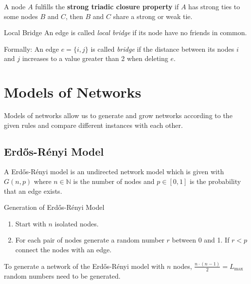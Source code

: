 \documentclass[english]{panikzettel}
\begin{document}
A node $ A $ fulfills the \textbf{strong triadic closure property} if $ A $ has strong ties to some nodes $ B $ and $ C $, then $ B $ and $ C $ share a strong or weak tie.

\begin{defi}{Local Bridge}
	An edge is called \emph{local bridge} if its node have no friends in common.

	Formally: An edge $ e = \{i,j\} $ is called \emph{bridge} if the distance between its nodes $ i $ and $ j $ increases to a value greater than 2 when deleting $ e $.
\end{defi}

\section{Models of Networks}
Models of networks allow us to generate and grow networks according to the given rules and compare different instances with each other.

\newcommand{\erdosrenyi}{Erd\H{o}s-Rényi }
\subsection{\erdosrenyi Model} \label{sec:erdosrenyi_model}
A \erdosrenyi model is an undirected network model which is given with $ G(n,p) $ where $ n \in \mathbb{N} $ is the number of nodes and $ p \in [0,1] $ is the probability that an edge exists.

\begin{algo}{Generation of \erdosrenyi Model}
\begin{enumerate}
	\item Start with $ n $ isolated nodes.
	\item For each pair of nodes generate a random number $ r $ between 0 and 1. If $ r < p $ connect the nodes with an edge.
\end{enumerate}
\end{algo}

To generate a network of the \erdosrenyi model with $ n $ nodes, \hyperref[sec:max_number_links]{$ \frac{n \cdot (n - 1)}{2} = L_\text{max} $} random numbers need to be generated.
\end{document}

